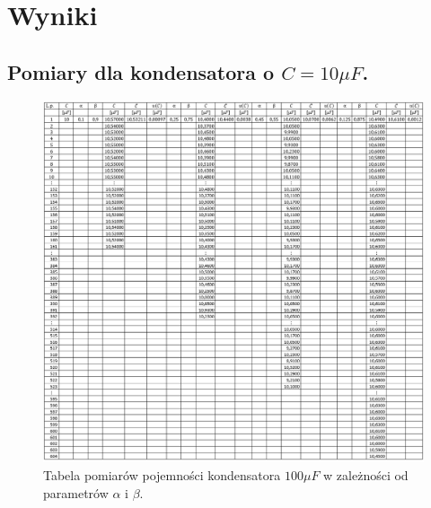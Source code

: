 \documentclass[12pt]{mwart}
\begin{document}
	\section{Wyniki}
	\subsection{Pomiary dla kondensatora o $C=10\mu F$.}
	\begin{figure}[H]
		\centering
		\includegraphics[width=1\linewidth, height=.9\textheight]{10_tab.jpg}
		\caption{Tabela pomiarów pojemności kondensatora $100\mu F$ w zależności od parametrów $\alpha$ i $\beta$.}
	\end{figure}
\end{document}

